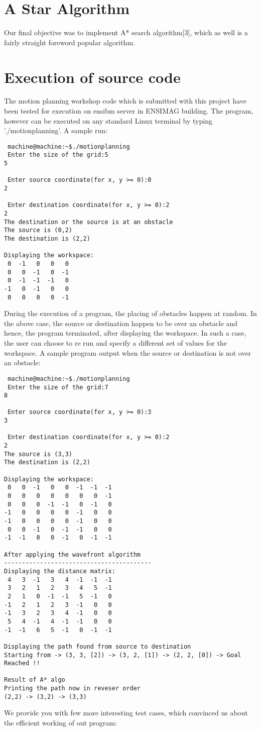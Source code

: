 \documentclass{report}
\begin{document}
\section{A Star Algorithm}
	Our final objective was to implement A* search algorithm[3], which as well is a fairly straight foreword popular algorithm.
	
\section{Execution of source code}

	The motion planning workshop code which is submitted with this project have been tested for execution on \textsf{ensibm} server in ENSIMAG building. The program, however can be executed on any standard Linux terminal by typing \textsf{'./motionplanning'}. A sample run:
	\begin{verbatim}
 machine@machine:~$./motionplanning
 Enter the size of the grid:5
5

 Enter source coordinate(for x, y >= 0):0
2

 Enter destination coordinate(for x, y >= 0):2
2
The destination or the source is at an obstacle
The source is (0,2) 
The destination is (2,2) 

Displaying the workspace:
 0	-1	 0	 0	 0	
 0	 0	-1	 0	-1	
 0	-1	-1	-1	 0	
-1	 0	-1	 0	 0	
 0	 0	 0	 0	-1	
	\end{verbatim}
	During the execution of a program, the placing of obstacles happen at random. In the above case, the source or destination happen to be over an obstacle and hence, the program terminated, after displaying the workspace. In such a case, the user can choose to re run and specify a different set of values for the \textsf{workspace}. A sample program output when the source or destination is not over an obstacle:
	
	\begin{verbatim}
 machine@machine:~$./motionplanning
 Enter the size of the grid:7
8

 Enter source coordinate(for x, y >= 0):3
3

 Enter destination coordinate(for x, y >= 0):2
2
The source is (3,3) 
The destination is (2,2) 

Displaying the workspace:
 0	 0	-1	 0	 0	-1	-1	-1	
 0	 0	 0	 0	 0	 0	 0	-1	
 0	 0	 0	-1	-1	 0	-1	 0	
-1	 0	 0	 0	 0	-1	 0	 0	
-1	 0	 0	 0	 0	-1	 0	 0	
 0	 0	-1	 0	-1	-1	 0	 0	
-1	-1	 0	 0	-1	 0	-1	-1	

After applying the wavefront algorithm
-----------------------------------------
Displaying the distance matrix:
 4	 3	-1	 3	 4	-1	-1	-1	
 3	 2	 1	 2	 3	 4	 5	-1	
 2	 1	 0	-1	-1	 5	-1	 0	
-1	 2	 1	 2	 3	-1	 0	 0	
-1	 3	 2	 3	 4	-1	 0	 0	
 5	 4	-1	 4	-1	-1	 0	 0	
-1	-1	 6	 5	-1	 0	-1	-1	

Displaying the path found from source to destination 
Starting from -> (3, 3, [2]) -> (3, 2, [1]) -> (2, 2, [0]) -> Goal Reached !!

Result of A* algo
Printing the path now in reveser order
(2,2) -> (3,2) -> (3,3)
	\end{verbatim}
	We provide you with few more \textsf{interesting} test cases, which convinced us about the efficient working of out program:
	
\end{document}
